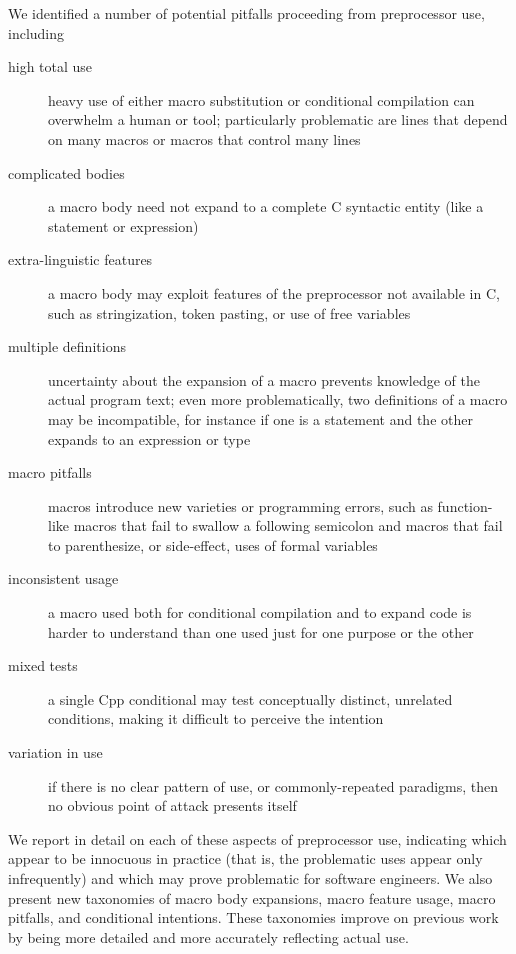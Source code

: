 \documentclass[10pt]{article}
\begin{document}
We identified a number of potential pitfalls proceeding from preprocessor
use, including
\begin{description}
\item[high total use]  heavy use of either macro substitution or
  conditional compilation can overwhelm a human or tool; particularly
  problematic are lines that depend on many macros or macros that control
  many lines
\item[complicated bodies]  a macro body need not expand to a complete
  C syntactic entity (like a statement or expression)
\item[extra-linguistic features]  a macro body may exploit features of
  the preprocessor not available in C, such as stringization, token
  pasting, or use of free variables
\item[multiple definitions]  uncertainty about the expansion of a macro
  prevents knowledge of the actual program text; even more problematically,
  two definitions of a macro may be incompatible, for instance if one is a
  statement and the other expands to an expression or type
\item[macro pitfalls]  macros introduce new varieties or programming
  errors, such as function-like macros that fail to swallow a following
  semicolon and macros that fail to parenthesize, or side-effect, uses of
  formal variables
\item[inconsistent usage]  a macro used both for conditional
  compilation and to expand code is harder to understand than one used just
  for one purpose or the other
\item[mixed tests]  a single Cpp conditional may test conceptually
  distinct, unrelated conditions, making it difficult to perceive the
  intention
\item[variation in use]  if there is no clear pattern of use, or
  commonly-repeated paradigms, then no obvious point of attack presents
  itself
\end{description}
We report in detail on each of these aspects of preprocessor use,
indicating which appear to be innocuous in practice (that is, the
problematic uses appear only infrequently) and which may prove problematic
for software engineers.  We also present new taxonomies of macro body
expansions, macro feature usage, macro pitfalls, and conditional
intentions.  These taxonomies improve on previous work by being more
detailed and more accurately reflecting actual use.
\end{document}
